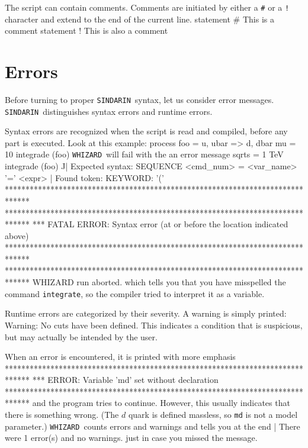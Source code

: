 \documentclass[12pt]{book}
\newenvironment{interaction}%
  {\begingroup\small
   \verbatim}%
  {\endverbatim
   \endgroup\noindent}
\newenvironment{code}%
  {\begingroup\footnotesize
   \quote
   \verbatim}%
  {\endverbatim
   \endquote
   \endgroup\noindent}
\newcommand{\whizard}{\texttt{WHIZARD}}
\newcommand{\sindarin}{\texttt{SINDARIN}}
\begin{document}
The script can contain comments.   Comments are initiated by either a \verb|#|
or a \verb|!| character and extend to the end of the current line.
\begin{code}
statement
# This is a comment
statement  ! This is also a comment
\end{code}


\section{Errors}

Before turning to proper \sindarin\ syntax, let us consider error messages.
\sindarin\ distinguishes syntax errors and runtime errors.

Syntax errors are recognized when the script is read and compiled,
before any part is executed.  Look at this example:
\begin{code}
process foo = u, ubar => d, dbar
mu = 10
integrade (foo)
\end{code} 
\whizard\ will fail with the an error message
\begin{interaction}
sqrts = 1 TeV
integrade (foo)
          ^^
| Expected syntax: SEQUENCE    <cmd_num> = <var_name> '=' <expr>
| Found token: KEYWORD:    '('
******************************************************************************
******************************************************************************
*** FATAL ERROR:  Syntax error (at or before the location indicated above)
******************************************************************************
******************************************************************************
WHIZARD run aborted.
\end{interaction}
which tells you that you have misspelled the command
\verb|integrate|, so the compiler tried to interpret it as a variable.

Runtime errors are categorized by their severity.  A warning is simply
printed:
\begin{interaction}
Warning: No cuts have been defined.
\end{interaction}
This indicates a condition that is suspicious, but may actually be
intended by the user.

When an error is encountered, it is printed with more emphasis
\begin{interaction}
******************************************************************************
*** ERROR: Variable 'md' set without declaration
******************************************************************************
\end{interaction}
and the program tries to continue.  However, this usually indicates
that there is something wrong.  (The $d$ quark is defined
massless, so \verb|md| is not a model parameter.)  \whizard\ counts
errors and warnings and tells you at the end
\begin{interaction}
| There were  1 error(s) and no warnings.
\end{interaction}
just in case you missed the message.
\end{document}
